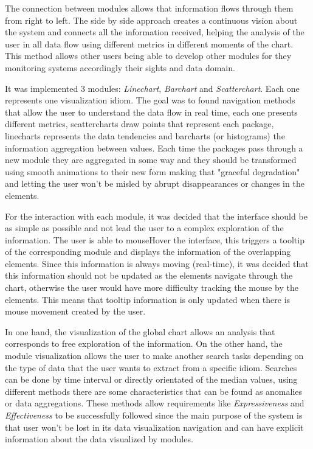 \documentclass[letterpaper, 10 pt, conference]{ieeeconf}  %
\begin{document}
The connection between modules allows that information flows through them from right to left. The side by side approach creates a continuous vision about the system and connects all the information received, helping the analysis of the user in all data flow using different metrics in different moments of the chart. This method allows other users being able to develop other modules for they monitoring systems accordingly their sights and data domain.

It was implemented 3 modules: \textit{Linechart}, \textit{Barchart} and \textit{Scatterchart}. Each one represents one visualization idiom. The goal was to found navigation methods that allow the user to understand the data flow in real time, each one presents different metrics, scattercharts draw points that represent each package, linecharts represents the data tendencies and barcharts (or histograms) the information aggregation between values.
Each time the packages pass through a new module they are aggregated in some way and they should be transformed using smooth animations to their new form making that "graceful degradation" and letting the user won't be misled by abrupt disappearances or changes in the elements. 

For the interaction with each module, it was decided that the interface should be as simple as possible and not lead the user to a complex exploration of the information. The user is able to mouseHover the interface, this triggers a tooltip of the corresponding module and displays the information of the overlapping elements. Since this information is always moving (real-time), it was decided that this information should not be updated as the elements navigate through the chart, otherwise the user would have more difficulty tracking the mouse by the elements. This means that tooltip information is only updated when there is mouse movement created by the user.

In one hand, the visualization of the global chart allows an analysis that corresponds to free exploration of the information. On the other hand, the module visualization allows the user to make another search tasks depending on the type of data that the user wants to extract from a specific idiom. Searches can be done by time interval or directly orientated of the median values, using different methods there are some characteristics that can be found as anomalies or data aggregations. \newline 
These methods allow requirements like \textit{Expressiveness} and \textit{Effectiveness} \cite{Mackinlay} to be successfully followed since the main purpose of the system is that user won't be lost in its data visualization navigation and can have explicit information about the data visualized by modules.
\end{document}
